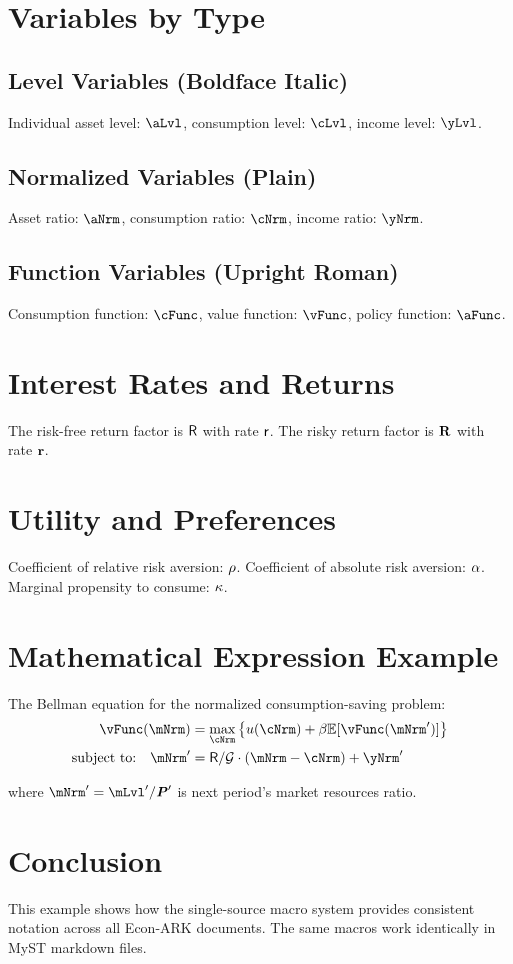 \documentclass{article}
\begin{document}
\section{Variables by Type}

\subsection{Level Variables (Boldface Italic)}
Individual asset level: $\aLvl$, consumption level: $\cLvl$, income level: $\yLvl$.

\subsection{Normalized Variables (Plain)}
Asset ratio: $\aNrm$, consumption ratio: $\cNrm$, income ratio: $\yNrm$.

\subsection{Function Variables (Upright Roman)}
Consumption function: $\cFunc$, value function: $\vFunc$, policy function: $\aFunc$.

\section{Interest Rates and Returns}

The risk-free return factor is $\mathsf{R}$ with rate $\mathsf{r}$. The risky return factor is $\mathbf{R}$ with rate $\mathbf{r}$.

\section{Utility and Preferences}

Coefficient of relative risk aversion: $\rho$. Coefficient of absolute risk aversion: $\alpha$. Marginal propensity to consume: $\kappa$.

\section{Mathematical Expression Example}

The Bellman equation for the normalized consumption-saving problem:
\begin{align}
\vFunc(\mNrm) &= \max_{\cNrm} \left\{ \util(\cNrm) + \DiscFac \Ex[\vFunc(\mNrm')] \right\} \\
\text{subject to:} \quad \mNrm' &= \Rfree/\PermGroFac \cdot (\mNrm - \cNrm) + \yNrm'
\end{align}

where $\mNrm' = \mLvl'/\PermLvl'$ is next period's market resources ratio.

\section{Conclusion}

This example shows how the single-source macro system provides consistent notation across all Econ-ARK documents. The same macros work identically in MyST markdown files.
\end{document}
